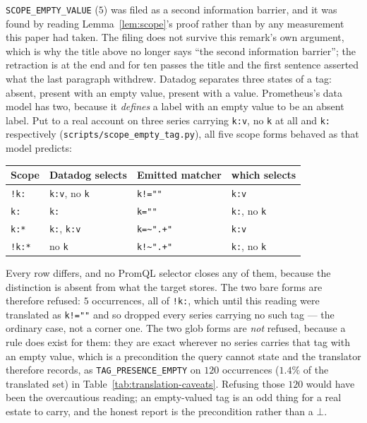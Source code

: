 \begin{remark}\label{rem:empty-tag}
\texttt{SCOPE\_EMPTY\_VALUE} ($5$) was filed as a second information barrier, and it was
found by reading Lemma~\ref{lem:scope}'s proof rather than by any measurement this paper
had taken. The filing does not survive this remark's own argument, which is why the title
above no longer says ``the second information barrier''; the retraction is at the end and
for ten passes the title and the first sentence asserted what the last paragraph
withdrew. Datadog
separates three states of a tag: absent, present with an empty value, present with a
value. Prometheus's data model has two, because it \emph{defines} a label with an empty
value to be an absent label. Put to a real account on three series carrying
\texttt{k:v}, no \texttt{k} at all and \texttt{k:} respectively
(\texttt{scripts\slash scope\_empty\_tag.py}), all five scope forms behaved as that model
predicts:
\begin{center}\footnotesize
\begin{tabular}{@{}llll@{}}
\toprule
Scope & Datadog selects & Emitted matcher & which selects \\
\midrule
\texttt{!k:}  & \texttt{k:v}, no \texttt{k} & \texttt{k!=""}                      & \texttt{k:v} \\
\texttt{k:}   & \texttt{k:}                 & \texttt{k=""}                       & \texttt{k:}, no \texttt{k} \\
\texttt{k:*}  & \texttt{k:}, \texttt{k:v}   & \texttt{k=\textasciitilde{}".+"}    & \texttt{k:v} \\
\texttt{!k:*} & no \texttt{k}               & \texttt{k!\textasciitilde{}".+"}    & \texttt{k:}, no \texttt{k} \\
\bottomrule
\end{tabular}
\end{center}
Every row differs, and no PromQL selector closes any of them, because the distinction is
absent from what the target stores. The two bare forms are therefore refused: $5$
occurrences, all of \texttt{!k:}, which until this reading were translated as
\texttt{k!=""} and so dropped every series carrying no such tag --- the ordinary case, not
a corner one. The two glob forms are \emph{not} refused, because a rule does exist for
them: they are exact wherever no series carries that tag with an empty value, which is a
precondition the query cannot state and the translator therefore records, as
\texttt{TAG\_PRESENCE\_EMPTY} on $120$ occurrences ($1.4\%$ of the translated set) in
Table~\ref{tab:translation-caveats}. Refusing those $120$ would have been the
overcautious reading; an empty-valued tag is an odd thing for a real estate to carry, and
the honest report is the precondition rather than a $\bot$.


\end{remark}
